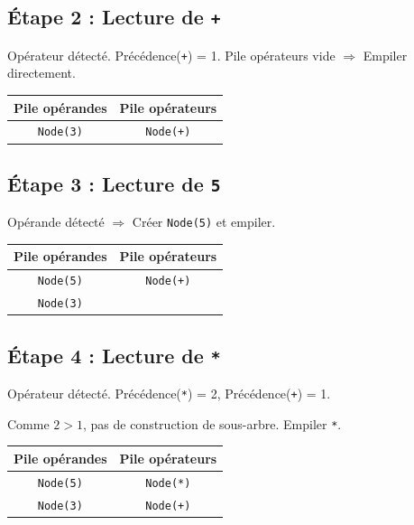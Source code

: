 \documentclass[12pt,a4paper]{article}
\begin{document}
\subsection{Étape 2 : Lecture de \texttt{+}}

Opérateur détecté. Précédence(\texttt{+}) = 1. Pile opérateurs vide $\Rightarrow$ Empiler directement.

\begin{center}
\begin{tabular}{|c|c|}
\hline
\textbf{Pile opérandes} & \textbf{Pile opérateurs} \\
\hline
\texttt{Node(3)} & \texttt{Node(+)} \\
\hline
\end{tabular}
\end{center}

\subsection{Étape 3 : Lecture de \texttt{5}}

Opérande détecté $\Rightarrow$ Créer \texttt{Node(5)} et empiler.

\begin{center}
\begin{tabular}{|c|c|}
\hline
\textbf{Pile opérandes} & \textbf{Pile opérateurs} \\
\hline
\texttt{Node(5)} & \texttt{Node(+)} \\
\texttt{Node(3)} & \\
\hline
\end{tabular}
\end{center}

\subsection{Étape 4 : Lecture de \texttt{*}}

Opérateur détecté. Précédence(\texttt{*}) = 2, Précédence(\texttt{+}) = 1.

Comme $2 > 1$, pas de construction de sous-arbre. Empiler \texttt{*}.

\begin{center}
\begin{tabular}{|c|c|}
\hline
\textbf{Pile opérandes} & \textbf{Pile opérateurs} \\
\hline
\texttt{Node(5)} & \texttt{Node(*)} \\
\texttt{Node(3)} & \texttt{Node(+)} \\
\hline
\end{tabular}
\end{center}
\end{document}
